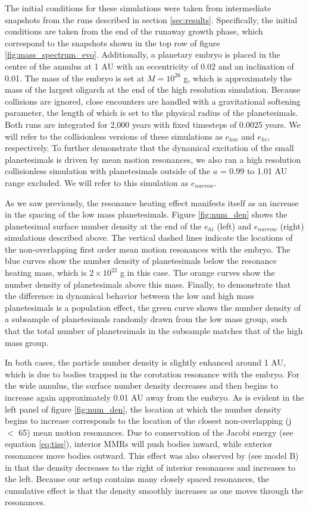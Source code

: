 The initial conditions for these simulations were taken from intermediate snapshots from the runs described in section 
\ref{sec:results}. Specifically, the initial conditions are taken from the end of the runaway growth phase, which correspond to the 
snapshots shown in the top row of figure \ref{fig:mass_spectrum_evo}. Additionally, a planetary embryo is placed in the centre of 
the annulus at 1 AU with an eccentricity of 0.02 and an inclination of 0.01. The mass of the embryo is set at $M = 10^{26}$ g, 
which is approximately the mass of the largest oligarch at the end of the high resolution simulation. Because collisions are 
ignored, close encounters are handled with a gravitational softening parameter, the length of which is set to the physical radius 
of the planetesimals. Both runs are integrated for 2,000 years with fixed timesteps of 0.0025 years. We will refer to the 
collisionless versions of these simulations as $e_{low}$ and $e_{hi}$, respectively. To further demonstrate that the dynamical 
excitation of the small planetesimals is driven by mean motion resonances, we also ran a high resolution collisionless simulation 
with planetesimals outside of the $a$ = 0.99 to 1.01 AU range excluded. We will refer to this simulation as $e_{narrow}$.

As we saw previously, the resonance heating effect manifests itself as an increase in the spacing of the low mass planetesimals. 
Figure \ref{fig:num_den} shows the planetesimal surface number density at the end of the $e_{hi}$ (left) and $e_{narrow}$ (right) 
simulations described above. The vertical dashed lines indicate the locations of the non-overlapping first order mean motion 
resonances with the embryo. The blue curves show the number density of planetesimals below the resonance heating mass, 
which is $2 \times 10^{22}$ g in this case. The orange curves show the number density of planetesimals above this mass. 
Finally, to demonstrate that the difference in dynamical behavior between the low and high mass planetesimals is a population 
effect, the green curve shows the number density of a subsample of planetesimals randomly drawn from the low mass group, 
such that the total number of planetesimals in the subsample matches that of the high mass group.

In both cases, the particle number density is slightly enhanced around 1 AU, which is due to bodies trapped in the corotation 
resonance with the embryo. For the wide annulus, the surface number density decreases and then begins to increase again 
approximately 0.01 AU away from the embryo. As is evident in the left panel of figure \ref{fig:num_den}, the location at which the 
number density begins to increase corresponds to the location of the closest non-overlapping (j $<$ 65) mean motion 
resonances. Due to conservation of the Jacobi energy (see equation \ref{eq:tiss}), interior MMRs will push bodies inward, while 
exterior resonances move bodies outward. This effect was also observed by \cite{richardson00} (see model B) in that the 
density decreases to the right of interior resonances and increases to the left. Because our setup contains many closely spaced 
resonances, the cumulative effect is that the density smoothly increases as one moves through the resonances. 

